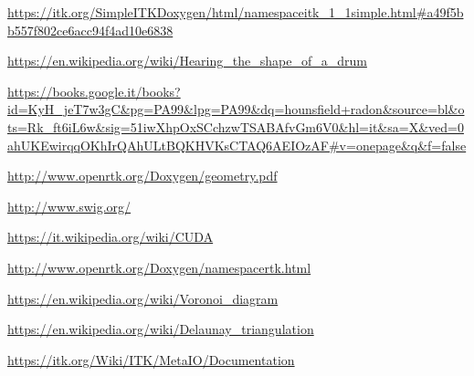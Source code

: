 \documentclass[a4paper,12pt, doubleside]{report}
\begin{document}
\begin{thebibliography}{1}
        \url{https://itk.org/SimpleITKDoxygen/html/namespaceitk_1_1simple.html#a49f5bb557f802ce6acc94f4ad10e6838}
        
        \url{https://en.wikipedia.org/wiki/Hearing_the_shape_of_a_drum}
        
        \url{https://books.google.it/books?id=KyH_jeT7w3gC&pg=PA99&lpg=PA99&dq=hounsfield+radon&source=bl&ots=Rk_ft6iL6w&sig=51iwXhpOxSCchzwTSABAfvGm6V0&hl=it&sa=X&ved=0ahUKEwirqqOKhIrQAhULtBQKHVKsCTAQ6AEIOzAF#v=onepage&q&f=false}
    
        \url{http://www.openrtk.org/Doxygen/geometry.pdf}
    
        \url{http://www.swig.org/}
    
        \url{https://it.wikipedia.org/wiki/CUDA}
        
        \url{http://www.openrtk.org/Doxygen/namespacertk.html}
    
        \url{https://en.wikipedia.org/wiki/Voronoi_diagram}
        
        \url{https://en.wikipedia.org/wiki/Delaunay_triangulation}
     
        \url{https://itk.org/Wiki/ITK/MetaIO/Documentation}
        
    \end{thebibliography}
\end{document}
